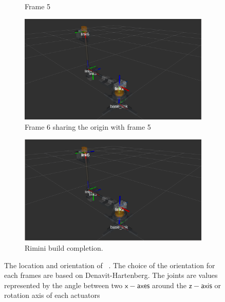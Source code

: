 \begin{figure}[h!]
\begin{subfigure}[t]{0.2\linewidth}
    \caption{Frame 5}
  \end{subfigure}
  \begin{subfigure}[t]{0.2\linewidth}
    \includegraphics[width=\linewidth]{r_mini_frame6.png}
    \caption{Frame 6 sharing the origin with frame 5}
  \end{subfigure}
  \begin{subfigure}[b]{0.4\linewidth}
    \includegraphics[width=\linewidth]{r_mini_local_frames.png}
    \caption{Rimini build completion.}
  \end{subfigure}

\caption{The location and orientation of \rimini~. The choice of the orientation for each frames are based on Denavit-Hartenberg.
          The joints are values represented by the angle between two $\mathsf{x-axes}$ around the $\mathsf{z-axis}$ or rotation axis of each actuators }
  \label{fig:rimini_joints}
\end{figure}
